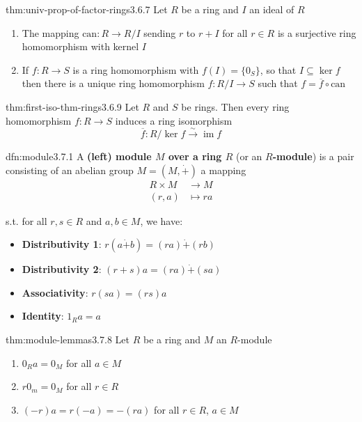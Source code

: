 \documentclass[landscape, 8pt]{extarticle}
\DeclareMathOperator{\im}{im}
\begin{document}
\begin{multicols}{3}
\begin{thm}{thm:univ-prop-of-factor-rings}{3.6.7}
    Let $R$ be a ring and $I$ an ideal of $R$
    \begin{enumerate}
        \setlength\itemsep{0em}
        \item The mapping $\text{can}: R \to R / I$ sending $r$ to $r + I$ for all $r\in R$ is a surjective ring homomorphism with kernel $I$
        \item If $f : R \to S$ is a ring homomorphism with $f(I) = \{0_{S}\}$, so that $I \subseteq \ker f$ then there is a unique ring homomorphism $f : R / I \to S$ such that $f = \overline{f} \circ \text{can}$
    \end{enumerate}
\end{thm}

\begin{thm}{thm:first-iso-thm-rings}{3.6.9}
    Let $R$ and $S$ be rings. Then every ring homomorphism $f : R\to S$ induces a ring isomorphism
    \[\overline{f} : R / \ker f \xrightarrow{\sim} \im f\]
\end{thm}

\begin{dfn}[Module]{dfn:module}{3.7.1}
    A \textbf{(left) module $M$ over a ring $R$} (or an \textbf{$R$-module}) is a pair consisting of an abelian group $M = (M, \dot{+})$ a mapping
    \begin{align*}
        R \times M &\to M\\
        (r, a) &\mapsto ra
    \end{align*}

    s.t. for all $r, s\in R$ and $a,b\in M$, we have:
    \begin{itemize}
        \setlength\itemsep{0em}
        \item \textbf{Distributivity 1}: $r(a \dot{+} b) = (ra) \dot{+} (rb)$
        \item \textbf{Distributivity 2}: $(r + s)a = (ra) \dot{+} (sa)$
        \item \textbf{Associativity}: $r (sa) = (rs) a$
        \item \textbf{Identity}: $1_{R}a = a$
    \end{itemize}
\end{dfn}


\begin{thm}{thm:module-lemmas}{3.7.8}
    Let $R$ be a ring and $M$ an $R$-module
    \begin{enumerate}
        \setlength\itemsep{0em}
        \item $0_{R}a = 0_{M}$ for all $a\in M$
        \item $r 0_{m} = 0_{M}$ for all $r\in R$
        \item $(-r) a = r(-a) = -(ra)$ for all $r\in R$, $a\in M$
    \end{enumerate}
\end{thm}


\end{multicols}
\end{document}

